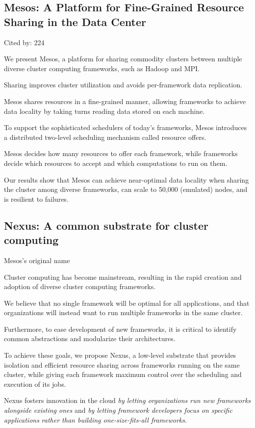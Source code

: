 \documentclass[a4paper,11pt]{article}
\begin{document}
\subsection*{Mesos: A Platform for Fine-Grained Resource Sharing in the Data Center}
{\color{cyan} {\color{magenta} Cited by: 224}

We present 
Mesos\cite{mesos}, 
a platform for sharing commodity clusters 
between multiple diverse cluster computing frameworks, 
such as Hadoop and MPI. 

Sharing 
improves cluster utilization and 
avoids per-framework data replication.

Mesos shares resources in a fine-grained manner,
allowing frameworks to achieve data locality by taking turns reading data stored on each machine. 

To support the sophisticated schedulers of today's frameworks,
Mesos introduces a distributed two-level scheduling mechanism called resource offers. 

Mesos decides how many resources to offer each framework, 
while frameworks decide which resources to accept and which computations to run on them. 

Our results show that 
Mesos 
can achieve near-optimal data locality when sharing the cluster among diverse frameworks, 
can scale to 50,000 (emulated) nodes, and 
is resilient to failures.

}

\subsection*{Nexus: A common substrate for cluster computing}
{\color{cyan} {\color{magenta} Mesos's original name}

Cluster computing has become mainstream, 
resulting in the rapid creation and adoption of diverse cluster computing frameworks. 

We believe that 
no single framework will be optimal for all applications, and that 
organizations will instead want to run multiple frameworks in the same cluster. 

Furthermore, 
to ease development of new frameworks, 
it is critical to identify common abstractions and modularize their architectures. 

To achieve these goals, 
we propose 
{\color{black} Nexus\cite{nexus}}, 
a low-level substrate that provides 
isolation and efficient resource sharing across frameworks running on the same cluster, 
while giving each framework maximum control over the scheduling and execution of its jobs. 

Nexus fosters innovation in the cloud 
{\em by letting organizations run new frameworks alongside existing ones} and 
{\em by letting framework developers focus on specific applications} 
{\em rather than building one-size-fits-all frameworks}.

}
\end{document}
